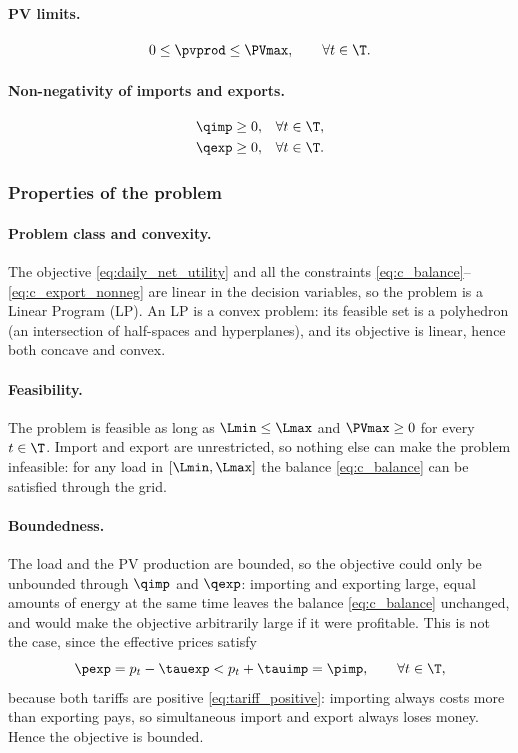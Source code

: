 \paragraph{PV limits.}
\begin{equation}
    0 \leq \pvprod \leq \PVmax, \qquad \forall t \in \T. \label{eq:c_pv_limit}
\end{equation}

\paragraph{Non-negativity of imports and exports.}
\begin{align}
    \qimp &\geq 0, & \forall t \in \T, \label{eq:c_import_nonneg} \\
    \qexp &\geq 0, & \forall t \in \T. \label{eq:c_export_nonneg}
\end{align}

\subsubsection{Properties of the problem}

\paragraph{Problem class and convexity.}
The objective \eqref{eq:daily_net_utility} and all the constraints
\eqref{eq:c_balance}--\eqref{eq:c_export_nonneg} are linear in the decision variables, so the
problem is a Linear Program (LP). An LP is a convex problem: its feasible set is a
polyhedron (an intersection of half-spaces and hyperplanes), and its objective is linear,
hence both concave and convex.

\paragraph{Feasibility.}
The problem is feasible as long as $\Lmin \leq \Lmax$ and $\PVmax \geq 0$ for every
$t \in \T$. Import and export are unrestricted, so nothing else can make the problem
infeasible: for any load in $[\Lmin, \Lmax]$ the balance \eqref{eq:c_balance} can be
satisfied through the grid.

\paragraph{Boundedness.}
The load and the PV production are bounded, so the objective could only be unbounded through
$\qimp$ and $\qexp$: importing and exporting large, equal amounts of energy at the same time
leaves the balance \eqref{eq:c_balance} unchanged, and would make the objective arbitrarily
large if it were profitable. This is not the case, since the effective prices satisfy
\begin{equation}
    \pexp = p_t - \tauexp < p_t + \tauimp = \pimp, \qquad \forall t \in \T,
\end{equation}
because both tariffs are positive \eqref{eq:tariff_positive}: importing always costs more than exporting pays, so
simultaneous import and export always loses money. Hence the objective is bounded.

